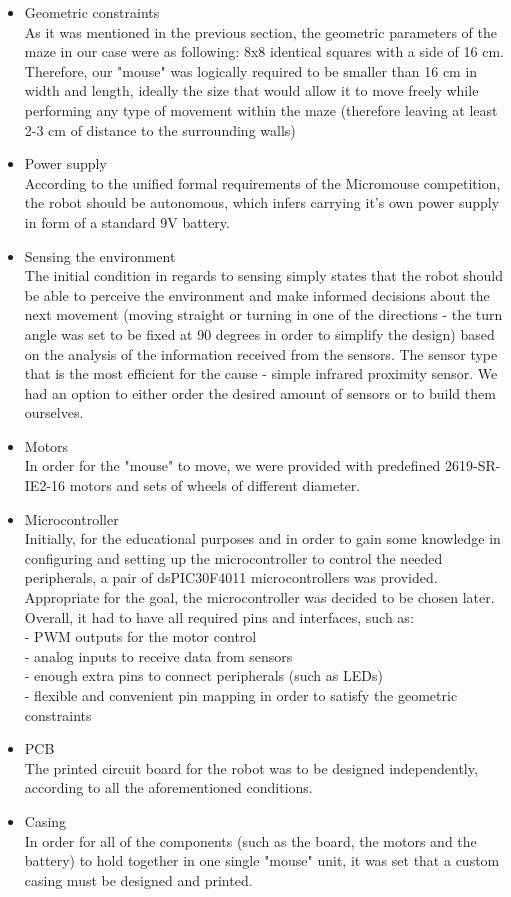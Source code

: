\begin{itemize}
    \item Geometric constraints\\ 
    As it was mentioned in the previous section, the geometric parameters of the maze in our case were as following: 8x8 identical squares with a side of 16 cm. Therefore, our "mouse" was logically required to be smaller than 16 cm in width and length, ideally the size that would allow it to move freely while performing any type of movement within the maze (therefore leaving at least 2-3 cm of distance to the surrounding walls)
    \item Power supply\\
    According to the unified formal requirements of the Micromouse competition, the robot should be autonomous, which infers carrying it's own power supply in form of a standard 9V battery.
    \item Sensing the environment\\
    The initial condition in regards to sensing simply states that the robot should be able to perceive the environment and make informed decisions about the next movement (moving straight or turning in one of the directions - the turn angle was set to be fixed at 90 degrees in order to simplify the design) based on the analysis of the information received from the sensors. The sensor type that is the most efficient for the cause - simple infrared proximity sensor. We had an option to either order the desired amount of sensors or to build them ourselves.
    \item Motors\\
    In order for the "mouse" to move, we were provided with predefined 2619-SR-IE2-16 motors and sets of wheels of different diameter.
    \item Microcontroller\\
    Initially, for the educational purposes and in order to gain some knowledge in configuring and setting up the microcontroller to control the needed peripherals, a pair of dsPIC30F4011 microcontrollers was provided. Appropriate for the goal, the microcontroller was decided to be chosen later. Overall, it had to have all required pins and interfaces, such as:\\
    - PWM outputs for the motor control\\
    - analog inputs to receive data from sensors\\
    - enough extra pins to connect peripherals (such as LEDs)\\
    - flexible and convenient pin mapping in order to satisfy the geometric constraints
    \item PCB\\
    The printed circuit board for the robot was to be designed independently, according to all the aforementioned conditions.
    \item Casing\\
    In order for all of the components (such as the board, the motors and the battery) to hold together in one single "mouse" unit, it was set that a custom casing must be designed and printed.
\end{itemize}

